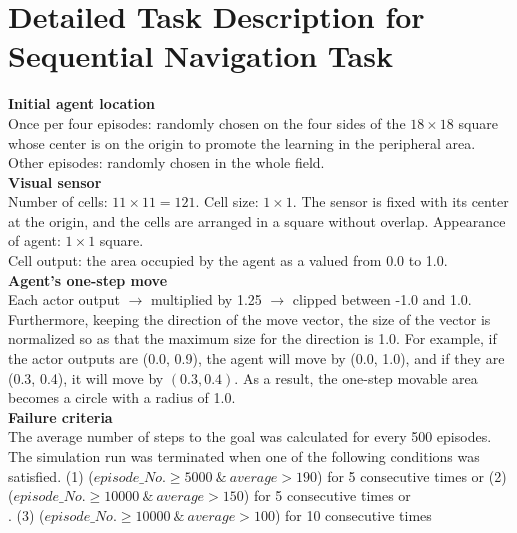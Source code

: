 \section{Detailed Task Description for Sequential Navigation Task}\label{App:Task}
\noindent
{\bf Initial agent location}\\
Once per four episodes: randomly chosen on the four sides of the $18\times 18$ square
whose center is on the origin to promote the learning in the peripheral area.\\
Other episodes: randomly chosen in the whole field.\\
{\bf Visual sensor}\\
Number of cells: $11 \times 11=121$. 
Cell size: $1\times1$.
The sensor is fixed with its center at the origin, and the cells are arranged in a square without overlap.
Appearance of agent: $1\times1$ square.\\
Cell output: the area occupied by the agent as a valued from 0.0 to 1.0.\\
{\bf Agent's one-step move}\\
Each actor output $\rightarrow$ multiplied by 1.25 $\rightarrow$ clipped between -1.0 and 1.0.
Furthermore, keeping the direction of the move vector, the size of the vector is normalized
so as that the maximum size for the direction is 1.0.
For example, if the actor outputs are (0.0, 0.9), the agent will move by (0.0, 1.0),
and if they are (0.3, 0.4), it will move by $(0.3, 0.4)$.
As a result, the one-step movable area becomes a circle with a radius of 1.0.\\
{\bf Failure criteria}\\
The average number of steps to the goal was calculated for every 500 episodes.
The simulation run was terminated when one of the following conditions was satisfied.
(1) ($episode\_No. \geq 5000\ \&\ average >190$) for 5 consecutive times
or (2) ($episode\_No. \geq 10000\ \&\ average > 150$) for 5 consecutive times
or\\.                               (3) ($episode\_No. \geq 10000\ \&\ average > 100$) for 10 consecutive times


